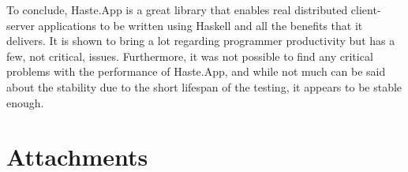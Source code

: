 \documentclass[a4paper]{article}
\begin{document}
To conclude, Haste.App is a great library that enables real distributed client-server applications to be written using Haskell and all the benefits that it delivers. It is shown to bring a lot regarding programmer productivity but has a few, not critical, issues. Furthermore, it was not possible to find any critical problems with the performance of Haste.App, and while not much can be said about the stability due to the short lifespan of the testing, it appears to be stable enough.

\newpage
{}
\printbibliography

\newpage
\section{Attachments}

\end{document}
